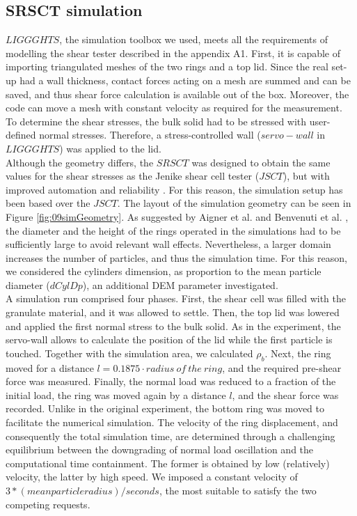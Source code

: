 \begin{appendix}
\subsection{SRSCT simulation}
\label{subsec:srsctsimulation}
$LIGGGHTS$, the simulation toolbox we used, meets all the requirements of modelling the shear tester described in the appendix A1. First, it is capable of importing triangulated meshes of the two rings and a top lid. Since the real set-up had a wall thickness, contact forces acting on a mesh are summed and can be saved, and thus shear force calculation is available out of the box. Moreover, the code can move a mesh with constant velocity as required for the measurement. To determine the shear stresses, the bulk solid had to be stressed with user-defined normal stresses. Therefore, a stress-controlled wall ($servo-wall$ in $LIGGGHTS$) was applied to the lid. \\
Although the geometry differs, the $SRSCT$ was designed to obtain the same values for the shear stresses as the Jenike shear cell tester ($JSCT$), but with improved automation and reliability \cite{RefWorks:118}. For this reason, the simulation setup has been based over the $JSCT$. The layout of the simulation geometry can be seen in Figure \ref{fig:09simGeometry}. As suggested by Aigner et al. \cite{RefWorks:139} and Benvenuti et al. \cite{RefWorks:173}, the diameter and the height of the rings operated in the simulations had to be sufficiently large to avoid relevant wall effects. Nevertheless, a larger domain increases the number of particles, and thus the simulation time. For this reason, we considered the cylinders dimension, as proportion to the mean particle diameter ($dCylDp$), an additional DEM parameter investigated. \\    
A simulation run comprised four phases. First, the shear cell was filled with the granulate material, and it was allowed to settle. Then, the top lid was lowered and applied the first normal stress to the bulk solid. As in the experiment, the servo-wall allows to calculate the position of the lid while the first particle is touched. Together with the simulation area, we calculated $\rho_b$. Next, the ring moved for a distance $l=0.1875 \cdot radius ~of ~the ~ring$, and the required pre-shear force was measured. Finally, the normal load was reduced to a fraction of the initial load, the ring was moved again by a distance $l$, and the shear force was recorded. Unlike in the original experiment, the bottom ring was moved to facilitate the numerical simulation. The velocity of the ring displacement, and consequently the total simulation time, are determined through a challenging equilibrium between the downgrading of normal load oscillation and the computational time containment. The former is obtained by low (relatively) velocity, the latter by high speed. We imposed a constant velocity of $3*(mean particle radius)/seconds$, the most suitable to satisfy the two competing requests. \\

\end{appendix}
